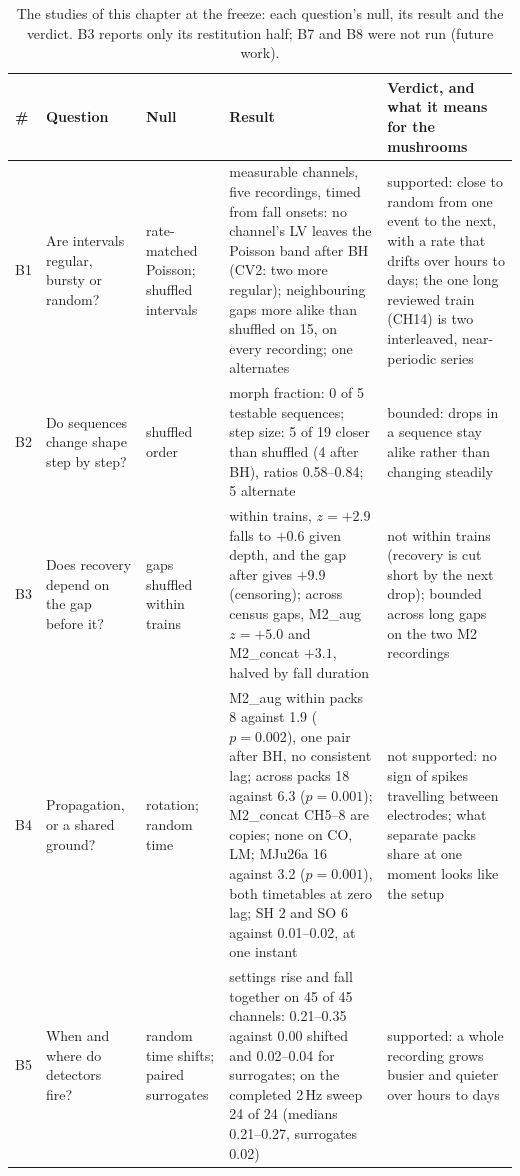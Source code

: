 \begin{table}[htbp]
\caption[{The signal studies: each question's null, result and verdict.}]{The studies of this chapter at the freeze: each question's null, its result and the verdict. B3 reports only its restitution half; B7 and B8 were not run (future work).}
\label{tab:rbsummary}
\fontsize{8.6}{10}\selectfont
\setlength{\tabcolsep}{4pt}
\begin{tabularx}{\textwidth}{@{}l >{\raggedright\arraybackslash}X >{\raggedright\arraybackslash}p{1.9cm} >{\raggedright\arraybackslash}p{4.5cm} >{\raggedright\arraybackslash}p{3.5cm}@{}}
\toprule
\textbf{\#} & \textbf{Question} & \textbf{Null} & \textbf{Result} & \textbf{Verdict, and what it means for the mushrooms}\\
\midrule
B1 & Are intervals regular, bursty or random? & rate-matched Poisson; shuffled intervals & 44 measurable channels, five recordings, timed from fall onsets: no channel's LV leaves the Poisson band after BH (CV2: two more regular); neighbouring gaps more alike than shuffled on 15, on every recording; one alternates & supported: close to random from one event to the next, with a rate that drifts over hours to days; the one long reviewed train (CH14) is two interleaved, near-periodic series\\
B2 & Do sequences change shape step by step? & shuffled order & morph fraction: 0 of 5 testable sequences; step size: 5 of 19 closer than shuffled (4 after BH), ratios 0.58--0.84; 5 alternate & bounded: drops in a sequence stay alike rather than changing steadily\\
B3 & Does recovery depend on the gap before it? & gaps shuffled within trains & within trains, $z=+2.9$ falls to $+0.6$ given depth, and the gap after gives $+9.9$ (censoring); across census gaps, M2\_aug $z=+5.0$ and M2\_concat $+3.1$, halved by fall duration & not within trains (recovery is cut short by the next drop); bounded across long gaps on the two M2 recordings\\
B4 & Propagation, or a shared ground? & rotation; random time & M2\_aug within packs 8 against 1.9 ($p=0.002$), one pair after BH, no consistent lag; across packs 18 against 6.3 ($p=0.001$); M2\_concat CH5--8 are copies; none on CO, LM; MJu26a 16 against 3.2 ($p=0.001$), both timetables at zero lag; SH 2 and SO 6 against 0.01--0.02, at one instant & not supported: no sign of spikes travelling between electrodes; what separate packs share at one moment looks like the setup\\
B5 & When and where do detectors fire? & random time shifts; paired surrogates & settings rise and fall together on 45 of 45 channels: 0.21--0.35 against 0.00 shifted and 0.02--0.04 for surrogates; on the completed 2\,Hz sweep 24 of 24 (medians 0.21--0.27, surrogates 0.02) & supported: a whole recording grows busier and quieter over hours to days\\

\end{tabularx}
\end{table}
